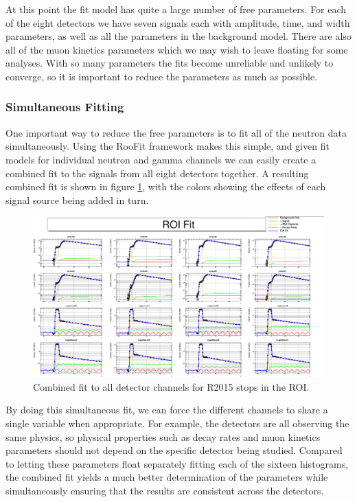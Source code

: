 At this point the fit model has quite a large number of free parameters.  
For each of the eight detectors we have seven signals each with amplitude, time, and width parameters, as well as all the parameters in the background model.
There are also all of the muon kinetics parameters which we may wish to leave floating for some analyses.  
With so many parameters the fits become unreliable and unlikely to converge, so it is important to reduce the parameters as much as possible.

\subsubsection{Simultaneous Fitting}

One important way to reduce the free parameters is to fit all of the neutron data simultaneously. 
Using the RooFit framework makes this simple, and given fit models for individual neutron and gamma channels we can easily create a combined fit to the signals from all eight detectors together.
A resulting combined fit is shown in figure \ref{fig:multi_fit}, with the colors showing the effects of each signal source being added in turn.

\begin{figure}[h]
  \includegraphics[width=\textwidth]{neutrons/figures/multifit_ROI_Zoom.png}
  \caption{Combined fit to all detector channels for R2015 stops in the ROI.}
  \label{fig:multi_fit}
\end{figure}

By doing this simultaneous fit, we can force the different channels to share a single variable when appropriate.  
For example, the detectors are all observing the same physics, so physical properties such as decay rates and muon kinetics parameters should not depend on the specific detector being studied.
Compared to letting these parameters float separately fitting each of the sixteen histograms, the combined fit yields a much better determination of the parameters while simultaneously ensuring that the results are consistent across the detectors.

